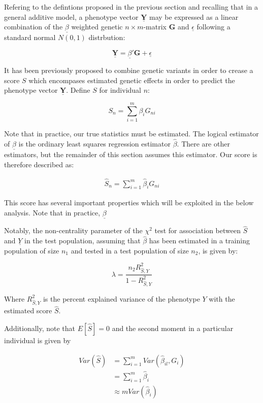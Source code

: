Refering to the defintions proposed in the previous section and recalling that in a general additive model, a phenotype vector $\underline{\mathbf{Y}}$ may be expressed as a linear combination of the $\underline{\beta}$ weighted genetic $n \times m$-matrix $\mathbf{G}$ and $\underline{\epsilon}$ following a standard normal $N(0, 1)$ distrbution: 

$$ \underline{\mathbf{Y}} = \underline{\beta}' \mathbf{G} + \underline{\epsilon} $$

It has been previously proposed to combine genetic variants in order to crease a score $S$ which encompases estimated genetic effects in order to predict the phenotype vector $\underline{\mathbf{Y}}$. Define $S$ for individual $n$:

$$ S_n = \sum^m_{i=1} \beta_i G_{ni} $$

Note that in practice, our true statistics must be estimated. The logical estimator of $\underline{\beta}$ is the ordinary least squares regression estimator $\hat{\beta}$. There are other estimators, but the remainder of this section assumes this estimator. Our score is therefore described as:

\begin{equation} 
\label{score}
\begin{aligned}
\hat{S}_n = \sum^m_{i=1} \hat{\beta}_i G_{ni} 
\end{aligned}
\end{equation}

This score has several important properties which will be exploited in the below analysis. Note that in practice, $\underline{\beta}$

Notably, the non-centrality parameter of the $\chi^2$ test for association between $\hat{S}$ and $\underline{Y}$ in the test population, assuming that $\hat{\beta}$ has been estimated in a training population of size $n_1$ and tested in a test population of size $n_2$, is given by:

$$ \lambda = \frac{n_2 R^2_{\hat{S}, Y}}{1 - R^2_{\hat{S}, Y}} $$

Where $R^2_{\hat{S}, Y}$ is the percent explained variance of the phenotype $Y$ with the estimated score $\hat{S}$. 

Additionally, note that $E[\hat{S}] = 0$ and the second moment in a particular individual is given by

$$ \begin{aligned} Var(\hat{S}) &= \sum^m_{i=1} Var(\hat{\beta}_{il}, G_{i}) \\ &= \sum^m_{i=1} \hat{\beta}_{i} \\ &\approx m Var(\hat{\beta}_{i}) \end{aligned} $$

